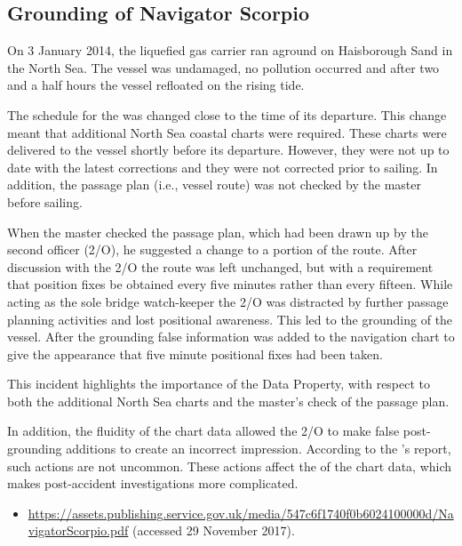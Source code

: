 \subsection{Grounding of Navigator Scorpio} \label{bkm:incacc:navscor}
On 3 January 2014, the liquefied gas carrier  ran aground on Haisborough Sand in the North Sea. The vessel was undamaged, no pollution occurred and after two and a half hours the vessel refloated on the rising tide.

The schedule for the  was changed close to the time of its departure. This change meant that additional North Sea coastal charts were required. These charts were delivered to the vessel shortly before its departure. However, they were not up to date with the latest corrections and they were not corrected prior to sailing. In addition, the passage plan (i.e., vessel route) was not checked by the master before sailing.

When the master checked the passage plan, which had been drawn up by the second officer (2/O), he suggested a change to a portion of the route. After discussion with the 2/O the route was left unchanged, but with a requirement that position fixes be obtained every five minutes rather than every fifteen. While acting as the sole bridge watch-keeper the 2/O was distracted by further passage planning activities and lost positional awareness. This led to the grounding of the vessel. After the grounding false information was added to the navigation chart to give the appearance that five minute positional fixes had been taken.

This incident highlights the importance of the  Data Property, with respect to both the additional North Sea charts and the master's check of the passage plan.

In addition, the fluidity of the chart data allowed the 2/O to make false post-grounding additions to create an incorrect impression. According to the 's report, such actions are not uncommon. These actions affect the  of the chart data, which makes post-accident investigations more complicated.

\begin{samepage}
\begin{itemize}
  \item \raggedright{\href{https://assets.publishing.service.gov.uk/media/547c6f1740f0b6024100000d/NavigatorScorpio.pdf}{https://assets.publishing.service.gov.uk/media/547c6f1740f0b6024100000d/NavigatorScorpio.pdf} (accessed 29 November 2017).}
\end{itemize}
\end{samepage}


